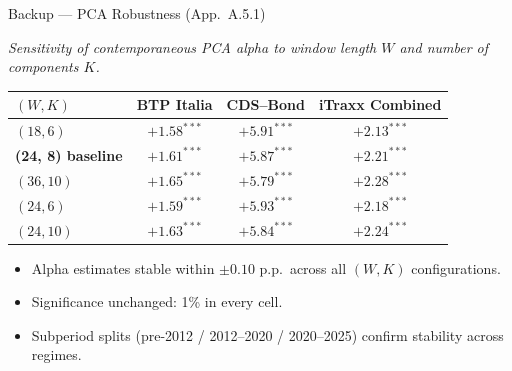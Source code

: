 \documentclass[aspectratio=169,11pt]{beamer}
\begin{document}
\begin{frame}[t]{Backup --- PCA Robustness (App.\ A.5.1)}
\centering
\scriptsize
\vspace{0.10cm}

\textit{Sensitivity of contemporaneous PCA alpha to window length $W$
and number of components $K$.}

\vspace{0.30cm}
\renewcommand{\arraystretch}{1.20}
\setlength{\tabcolsep}{8pt}

\begin{tabular}{lccc}
\toprule
$(W, K)$               & BTP Italia       & CDS--Bond        & iTraxx Combined \\
\midrule
$(18, 6)$              & $+1.58^{***}$    & $+5.91^{***}$    & $+2.13^{***}$ \\
\textbf{(24, 8) baseline} & $+1.61^{***}$    & $+5.87^{***}$    & $+2.21^{***}$ \\
$(36, 10)$             & $+1.65^{***}$    & $+5.79^{***}$    & $+2.28^{***}$ \\
$(24, 6)$              & $+1.59^{***}$    & $+5.93^{***}$    & $+2.18^{***}$ \\
$(24, 10)$             & $+1.63^{***}$    & $+5.84^{***}$    & $+2.24^{***}$ \\
\bottomrule
\end{tabular}

\vspace{0.40cm}

\begin{itemize}\itemsep=0.06cm\footnotesize
  \item Alpha estimates stable within $\pm 0.10$ p.p.\ across all $(W,K)$ configurations.
  \item Significance unchanged: 1\% in every cell.
  \item Subperiod splits (pre-2012 / 2012--2020 / 2020--2025) confirm stability across regimes.
\end{itemize}

\end{frame}
\end{document}

